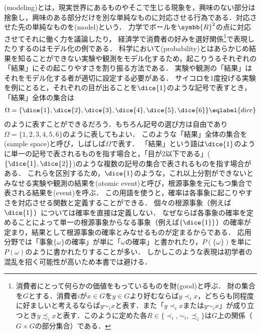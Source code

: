 \documentclass[../main.tex]{subfiles}
\begin{document}

(modeling)とは，現実世界にあるものやそこで生じる現象を，興味のない部分は捨象し，興味のある部分だけを別な単純なものに対応させる行為である．対応させた先の単純なものを(model)という．
力学でボールを\(\symbb{R}^2\)の点に対応させてそれに働く力を議論したり，
経済学で消費者の好みを選好関係\footnote{%
消費者にとって何らかの価値をもっているものを財(good)と呼ぶ．
財の集合を\(G\)とする．消費者\(i\)が\(x \in G\)を\(y \in G\)より好むならば\(y \prec_i x\)，どちらも同程度に好ましいと考えるならば\(y \sim_i x\)と表す．また「\(y \prec_i x\)または\(y \sim_i x\)」が成り立つとき\(y \precsim_i x\)と表す．このように定めた各\(R \in \{\prec_i, \sim_i, \precsim_i\}\)は\(G\)上の関係（\(G \times G\)の部分集合）である．
}で表現したりするのはモデル化の例である．
科学において(probability)とはあらかじめ結果を知ることができない実験や観測をモデル化するため，起こりうるそれぞれの「結果」にその起こりやすさを割り振る方法である．
実験や観測の「結果」はそれをモデル化する者が適切に設定する必要がある．
サイコロを1度投げる実験を例にとると，それぞれの目が出ることを\(\dice{1}\)のような記号で表すとき，「結果」全体の集合は
\begin{align}
    \Omega = \{\dice{1}, \dice{2}, \dice{3}, \dice{4}, \dice{5}, \dice{6}\} \eqlabel{dice}
\end{align}
のように表すことができるだろう．もちろん記号の選び方は自由であり\(\Omega = \{1, 2, 3, 4, 5, 6\}\)のように表してもよい．
このような「結果」全体の集合を(sample space)と呼び，しばしば\(\Omega\)で表す．
「結果」という語は\(\dice{1}\)のように単一の記号で表されるものを指す場合と，「目が\(2\)以下である」(\(\{\dice{1}, \dice{2}\}\))のような複数の記号の集合で表されるものを指す場合がある．
これらを区別するため，\(\dice{1}\)のような，これ以上分割ができないとみなせる実験や観測の結果を(atomic event)と呼び，根源事象を元にもつ集合で表される結果を(event)を呼ぶ．
この用語を使うと，確率は各事象に起こりやすさを対応させる関数と定義することができる．
個々の根源事象（例えば\(\dice{1}\)）については確率を直接は定義しない．
なぜならば各事象の確率を定めることによって単一の根源事象からなる事象（例えば\(\{\dice{1}\}\)）の確率が定まり，結果として根源事象の確率とみなせるものが定まるからである．
応用分野では「事象\(\{\omega\}\)の確率」が単に「\(\omega\)の確率」と書かれたり，\(P(\{\omega\})\)を単に\(P(\omega)\)のように書かれたりすることが多い．
しかしこのような表現は初学者の混乱を招く可能性が高いため本書では避ける．
\end{document}
